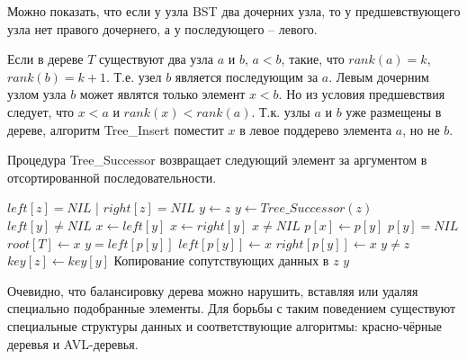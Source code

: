 Можно показать, что если у узла BST два дочерних узла, то у предшевствующего узла нет правого дочернего, а у последующего -- левого.

Если в дереве $T$ существуют два узла $a$ и $b$, $a < b$, такие, что $rank(a) = k$, $rank(b) = k+1$. Т.е. узел $b$ является последующим за $a$. Левым дочерним узлом узла $b$ может являтся только элемент $x < b$. Но из условия предшевствия следует, что $x < a$ и $rank(x) < rank(a)$. Т.к. узлы $a$ и $b$ уже размещены в дереве, алгоритм Tree\_Insert поместит $x$ в левое поддерево элемента $a$, но не $b$.

Процедура Tree\_Successor возвращает следующий элемент за аргументом в отсортированной последовательности.

\begin{codebox}
\li \If $left[z] = NIL$ | $right[z] = NIL$
\li   \Then $y \gets z$
\li   \Else $y \gets Tree\_Successor(z)$
  \End
\li \If $left[y] \neq NIL$
\li   \Then $x \gets left[y]$
\li   \Else $x \gets right[y]$
  \End
\li \If $x \neq NIL$
\li   \Then $p[x] \gets p[y]$
  \End
\li \If $p[y] = NIL$
\li   \Then $root[T] \gets x$
\li   \Else \If $y = left[p[y]]$
\li         \Then $left[p[y]] \gets x$
\li         \Else $right[p[y]] \gets x$
  \End
\End
\li \If $y \neq z$
\li   \Then $key[z] \gets key[y]$
\li   \Comment Копирование сопутствующих данных в $z$
  \End
\li \Return $y$
\End
\end{codebox}

Очевидно, что балансировку дерева можно нарушить, вставляя или удаляя специально подобранные элементы. Для борьбы с таким поведением существуют специальные структуры данных и соответствующие алгоритмы: красно-чёрные деревья и AVL-деревья.


